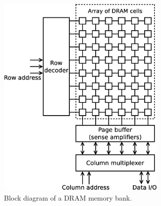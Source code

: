 \documentclass[a4paper,11pt]{kthesis}
\begin{document}
\begin{figure}
\centering
\includegraphics[height=100mm]{drambank.eps}
\caption{Block diagram of a DRAM memory bank.}
\label{fig:drambank}
\end{figure}
\end{document}
